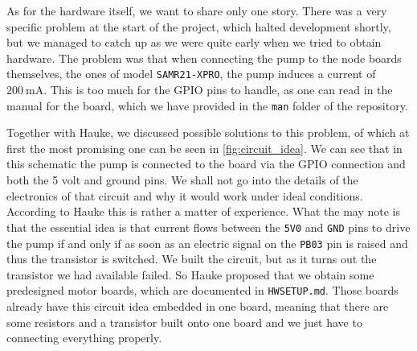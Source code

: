 \documentclass[acmtog, language=english, nonacm]{acmart}
\begin{document}
    As for the hardware itself, we want to share only one story. There was a very specific problem at the start of the project, which halted development shortly, but we managed to catch up as we were quite early when we tried to obtain hardware. The problem was that when connecting the pump to the node boards themselves, the ones of model \texttt{SAMR21-XPRO}, the pump induces a current of \(\qty{200}{\milli\ampere}\). This is too much for the GPIO pins to handle, as one can read in the manual for the board, which we have provided in the \texttt{man} folder of the repository.

    Together with Hauke, we discussed possible solutions to this problem, of which at first the most promising one can be seen in \cref{fig:circuit_idea}. We can see that in this schematic the pump is connected to the board via the GPIO connection and both the 5 volt and ground pins. We shall not go into the details of the electronics of that circuit and why it would work under ideal conditions. According to Hauke this is rather a matter of experience. What the may note is that the essential idea is that current flows between the \texttt{5V0} and \texttt{GND} pins to drive the pump if and only if as soon as an electric signal on the \texttt{PB03} pin is raised and thus the transistor is switched. We built the circuit, but as it turns out the transistor we had available failed. So Hauke proposed that we obtain some predesigned motor boards, which are documented in \texttt{HWSETUP.md}. Those boards already have this circuit idea embedded in one board, meaning that there are some resistors and a transistor built onto one board and we just have to connecting everything properly.
\end{document}
